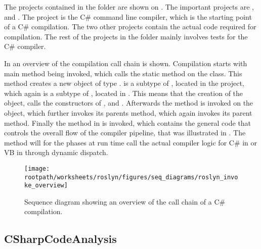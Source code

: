 The projects contained in the  folder are shown on . The important projects are ,  and . The  project is the C\# command line compiler, which is the starting point of a C\# compilation. The two other projects contain the actual code required for compilation. The rest of the projects in the  folder mainly involves tests for the C\# compiler.

In  an overview of the compilation call chain is shown. Compilation starts with  main method being invoked, which calls the static  method on the  class. This method creates a new  object of type .  is a subtype of , located in the  project, which again is a subtype of , located in . This means that the creation of the  object, calls the constructors of ,  and . Afterwards the  method is invoked on the  object, which further invokes its parents  method, which again invokes its parent  method. Finally the  method in  is invoked, which contains the general code that controls the overall flow of the compiler pipeline, that was illustrated in . The  method will for the phases at run time call the actual compiler logic for C\# in  or \ac{VB} in  through dynamic dispatch.

\begin{sidewaysfigure}[htbp]
\centering
 \texttt{[image: \\rootpath/worksheets/roslyn/figures/seq\_diagrams/roslyn\_invoke\_overview]} 
 \caption{Sequence diagram showing an overview of the call chain of a C\# compilation.}
\label{fig:roslyn_invoke_overview}
\end{sidewaysfigure}

\subsection{CSharpCodeAnalysis}

